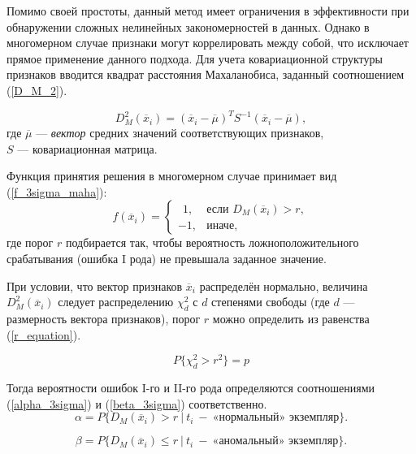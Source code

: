 Помимо своей простоты, данный метод имеет ограничения в эффективности при обнаружении сложных нелинейных закономерностей в данных. Однако в многомерном случае признаки могут коррелировать между собой, что исключает прямое применение данного подхода. Для учета ковариационной структуры признаков вводится квадрат расстояния Махаланобиса, заданный соотношением (\ref{D_M_2}).

\begin{equation}\label{D_M_2}
D_M^2(\overline{x}_i) = (\overline{x}_i - \overline{\mu})^T S^{-1} (\overline{x}_i - \overline{\mu}),
\end{equation}
где $\overline{\mu}$ --- \textit{вектор} средних значений соответствующих признаков, \\
$S$  --- ковариационная матрица.

Функция принятия решения в многомерном случае принимает вид (\ref{f_3sigma_maha}):
\begin{equation}\label{f_3sigma_maha}
    f(\overline{x}_i) = \begin{cases}
         \ \ 1, & \text{если } D_M(\overline{x}_i) > r, \\
        -1, & \text{иначе},
    \end{cases}
\end{equation}
где порог $r$ подбирается так, чтобы вероятность ложноположительного срабатывания (ошибка I рода) не превышала заданное значение.

При условии, что вектор признаков \(\overline{x}_i\) распределён нормально, величина \(D_M^2(\overline{x}_i)\) следует распределению \(\chi^2_d\) с \(d\) степенями свободы (где \(d\) --- размерность вектора признаков), порог \(r\) можно определить из равенства (\ref{r_equation}).

\begin{equation}\label{r_equation}
    P\Big\{ \chi^2_d > r^2 \Big\} = p
\end{equation}

Тогда вероятности ошибок I-го и II-го рода определяются соотношениями (\ref{alpha_3sigma}) и (\ref{beta_3sigma}) соответственно.
\begin{equation}\label{alpha_3sigma}
\alpha = P\Big\{ D_M(\overline{x}_i) > r \ \Big|\ t_i\ -\ \text{«нормальный» экземпляр} \Big\}.
\end{equation}

\begin{equation}\label{beta_3sigma}
    \beta = P\Big\{ D_M(\overline{x}_i) \le r \ \Big|\ t_i\ -\ \text{«аномальный» экземпляр} \Big\}.
\end{equation}

